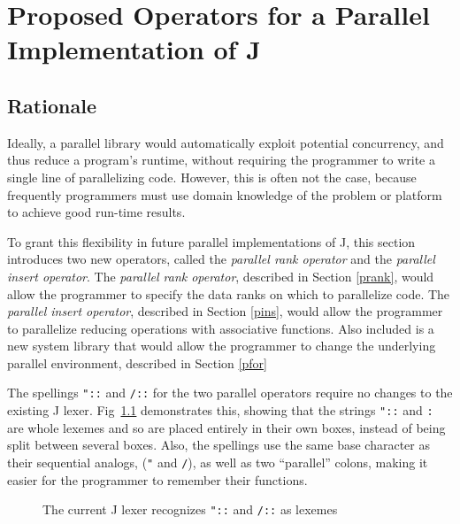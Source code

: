 \chapter{Proposed Operators for a Parallel Implementation of J} 
\label{paraop}

\section{Rationale}
Ideally, a parallel library would automatically exploit potential concurrency, 
and thus reduce a program's runtime, 
without requiring the programmer to write a single line of parallelizing code. 
However, this is often not the case,  
because frequently programmers must use domain knowledge 
of the problem or platform to achieve good run-time results. 

To grant this flexibility in future parallel implementations of J, 
this section introduces two new operators, called the \textit{parallel rank operator} 
and the \textit{parallel insert operator}.
The \textit{parallel rank operator}, described in Section \ref{prank}, 
would allow the programmer to specify the data ranks on which to parallelize code.
The \textit{parallel insert operator}, described in Section \ref{pins}, 
would allow the programmer to parallelize reducing operations with associative functions.
Also included is a new system library 
that would allow the programmer to change the underlying parallel environment,
described in Section \ref{pfor}

The spellings \texttt{"::} and \texttt{/::} for the two parallel operators 
require no changes to the existing J lexer\cite{ioj}.
Fig~\ref{fig:jlexer-pres} demonstrates this, showing that the strings 
\texttt{"::} and \texttt{\::} are whole lexemes and so are placed entirely in their own boxes, 
instead of being split between several boxes.
Also, the spellings use the same base character as their sequential analogs, (\texttt{"} and \texttt{/}), 
as well as two ``parallel'' colons, making it easier for the programmer to remember their functions.

\begin{figure}[htbp]
\begin{quote}
\begin{singlespacing}
\begin{small}
\end{small}
\end{singlespacing}
\end{quote}
\caption{The current J lexer recognizes \texttt{"::} and \texttt{/::} as lexemes}
\label{fig:jlexer-pres}
\end{figure}

